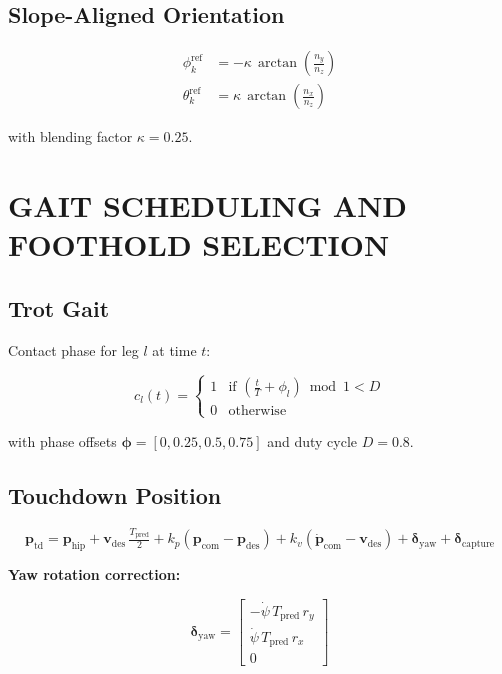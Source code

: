 \documentclass[11pt,a4paper]{article}
\begin{document}
\subsection{Slope-Aligned Orientation}

\begin{align}
\phi_k^{\text{ref}} &= -\kappa\,\arctan\!\left(\frac{n_y}{n_z}\right) \\
\theta_k^{\text{ref}} &= \kappa\,\arctan\!\left(\frac{n_x}{n_z}\right)
\end{align}

with blending factor $\kappa = 0.25$.

\section{GAIT SCHEDULING AND FOOTHOLD SELECTION}

\subsection{Trot Gait}

Contact phase for leg $l$ at time $t$:

\begin{equation}
c_l(t) = \begin{cases} 1 & \text{if } \left(\frac{t}{T} + \phi_l\right) \bmod 1 < D \\ 0 & \text{otherwise} \end{cases}
\end{equation}

with phase offsets $\boldsymbol{\phi} = [0, 0.25, 0.5, 0.75]$ and duty cycle $D = 0.8$.

\subsection{Touchdown Position}

\begin{equation}
\mathbf{p}_{\text{td}} = \mathbf{p}_{\text{hip}} + \mathbf{v}_{\text{des}}\,\tfrac{T_{\text{pred}}}{2} + k_p(\mathbf{p}_{\text{com}} - \mathbf{p}_{\text{des}}) + k_v(\dot{\mathbf{p}}_{\text{com}} - \mathbf{v}_{\text{des}}) + \boldsymbol{\delta}_{\text{yaw}} + \boldsymbol{\delta}_{\text{capture}}
\end{equation}

\textbf{Yaw rotation correction:}

\begin{equation}
\boldsymbol{\delta}_{\text{yaw}} = \begin{bmatrix} -\dot{\psi}\,T_{\text{pred}}\,r_y \\ \dot{\psi}\,T_{\text{pred}}\,r_x \\ 0 \end{bmatrix}
\end{equation}
\end{document}
